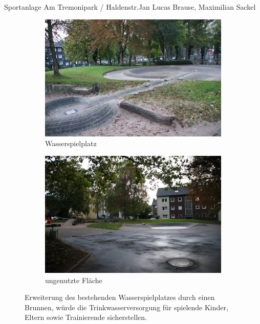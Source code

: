 \documentclass{../../templates/amendment}
\begin{document}
\begin{boxed}{Sportanlage Am Tremonipark / Haldenstr.}{Jan Lucas Brause, Maximilian Sackel}
    \begin{figure}[htpb]
        \centering
        \begin{subfigure}[]{0.49\textwidth}
            \begin{center}
                \includegraphics[width=\linewidth]{pictures/photo2.jpg}
                \caption{Wasserspielplatz}%
            \end{center}
        \end{subfigure}
        \begin{subfigure}[]{0.49\textwidth}
            \begin{center}
                \includegraphics[width=\linewidth]{pictures/photo4.jpg}
                \caption{ungenutzte Fläche}%
            \end{center}
        \end{subfigure}
        \caption{Erweiterung des bestehenden Wasserspielplatzes durch einen
            Brunnen, würde die Trinkwasserversorgung für spielende Kinder, Eltern
        sowie Trainierende sicherstellen.}
    \end{figure}
\end{boxed}
\end{document}
